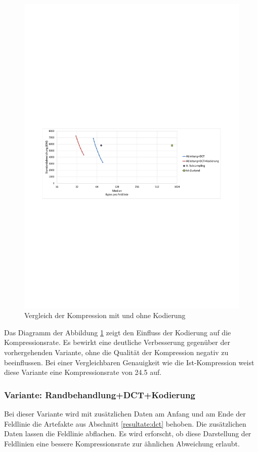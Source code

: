 \begin{figure}[!htbp]
	\center
	\includegraphics[trim = 1.8cm 11.25cm 1.8cm 12.75cm, clip=true,width=1\textwidth,keepaspectratio]{./pictures/resultate/loesung1/loesung1-6/loesung1_6.pdf}
	\caption{Vergleich der Kompression mit und ohne Kodierung}
	\label{resultate:loesung1:dct:kodierung}
\end{figure}
Das Diagramm der Abbildung \ref{resultate:loesung1:dct:kodierung} zeigt den Einfluss der Kodierung auf die Kompressionsrate. Es bewirkt eine deutliche Verbesserung gegenüber der vorhergehenden Variante, ohne die Qualität der Kompression negativ zu beeinflussen. Bei einer Vergleichbaren Genauigkeit wie die Ist-Kompression weist diese Variante eine Kompressionsrate von 24.5 auf.

\subsubsection{Variante: Randbehandlung+DCT+Kodierung} \label{resultate:loesung1:dct:randbeh+byte}
Bei dieser Variante wird mit zusätzlichen Daten am Anfang und am Ende der Feldlinie die Artefakte aus Abschnitt \ref{resultate:dct} behoben. Die zusätzlichen Daten lassen die Feldlinie abflachen. Es wird erforscht, ob diese Darstellung der Feldlinien eine bessere Kompressionsrate zur ähnlichen Abweichung erlaubt. 

